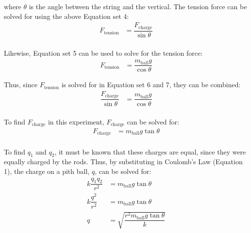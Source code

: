 \documentclass [12pt, letterpaper, twoside] {article}
\begin{document}
\noindent
where \(\theta\) is the angle between the string and the vertical. The tension force can be solved for using the above Equation set 4:
\begin{equation}
  \begin{split}
    F_{\text{tension}} &= \dfrac{F_{\text{charge}}}{\sin{\theta}} \\
  \end{split}
\end{equation}

\noindent
Likewise, Equation set 5 can be used to solve for the tension force:
\begin{equation}
  \begin{split}
    F_{\text{tension}} &= \dfrac{m_{\text{ball}}g}{\cos{\theta}}
  \end{split}
\end{equation}

\noindent
Thus, since \(F_{\text{tension}}\) is solved for in Equation set 6 and 7, they can be combined:
\begin{equation}
  \begin{split}
    \dfrac{F_{\text{charge}}}{\sin{\theta}} &= \dfrac{m_{\text{ball}}g}{\cos{\theta}} \\
  \end{split}
\end{equation}

\noindent
To find \(F_{\text{charge}}\) in this experiment, \(F_{\text{charge}}\) can be solved for:
\begin{equation}
  \begin{split} 
    F_{\text{charge}} &= m_{\text{ball}}g\tan{\theta} \\
  \end{split}
\end{equation}

\noindent
To find \(q_{1}\) and \(q_{2}\), it must be known that these charges are equal, since they were equally charged by the rods. Thus, by substituting in Coulomb's Law (Equation 1), the charge on a pith ball, \(q\), can be solved for:
\begin{equation}
  \begin{split}
    k\dfrac{q_{1}q_{2}}{r^2} &= m_{\text{ball}}g\tan{\theta} \\
    k\dfrac{q^2}{r^2} &= m_{\text{ball}}g\tan{\theta} \\
    q &= \sqrt{\dfrac{r^{2}m_{\text{ball}}g\tan{\theta}}{k}} \\
  \end{split}
\end{equation}
\end{document}
